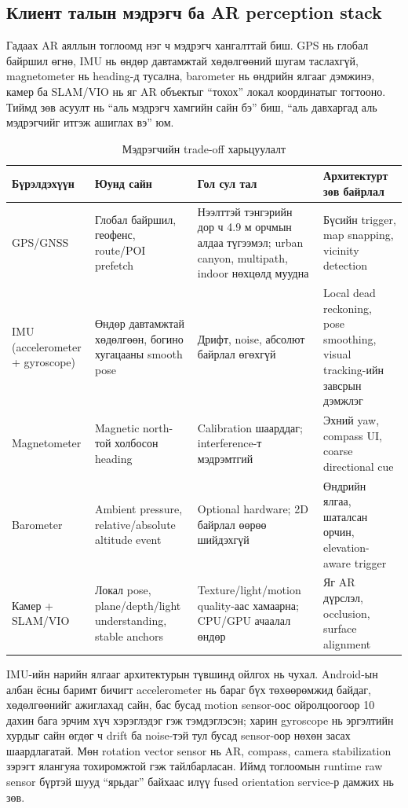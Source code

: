 \begin{sloppy}
\section*{Клиент талын мэдрэгч ба AR perception stack}

Гадаах AR аяллын тоглоомд нэг ч мэдрэгч хангалттай биш. GPS нь глобал байршил өгнө, IMU нь өндөр давтамжтай хөдөлгөөний шугам таслахгүй, magnetometer нь heading-д тусална, barometer нь өндрийн ялгааг дэмжинэ, камер ба SLAM/VIO нь яг AR объектыг ``тохох'' локал координатыг тогтооно. Тиймд зөв асуулт нь ``аль мэдрэгч хамгийн сайн бэ'' биш, ``аль давхаргад аль мэдрэгчийг итгэж ашиглах вэ'' юм.

\begin{table}[H]
\centering
\caption{Мэдрэгчийн trade-off харьцуулалт}
\label{tab:sensor-tradeoff}
\small
\begin{tabular}{|p{2.5cm}|p{3cm}|p{3.5cm}|p{3cm}|}
\hline
\textbf{Бүрэлдэхүүн} & \textbf{Юунд сайн} & \textbf{Гол сул тал} & \textbf{Архитектурт зөв байрлал} \\ \hline
GPS/GNSS & Глобал байршил, геофенс, route/POI prefetch & Нээлттэй тэнгэрийн дор ч 4.9 м орчмын алдаа түгээмэл; urban canyon, multipath, indoor нөхцөлд муудна & Бүсийн trigger, map snapping, vicinity detection \\ \hline
IMU (accelerometer + gyroscope) & Өндөр давтамжтай хөдөлгөөн, богино хугацааны smooth pose & Дрифт, noise, абсолют байрлал өгөхгүй & Local dead reckoning, pose smoothing, visual tracking-ийн завсрын дэмжлэг \\ \hline
Magnetometer & Magnetic north-той холбосон heading & Calibration шаарддаг; interference-т мэдрэмтгий & Эхний yaw, compass UI, coarse directional cue \\ \hline
Barometer & Ambient pressure, relative/absolute altitude event & Optional hardware; 2D байрлал өөрөө шийдэхгүй & Өндрийн ялгаа, шаталсан орчин, elevation-aware trigger \\ \hline
Камер + SLAM/VIO & Локал pose, plane/depth/light understanding, stable anchors & Texture/light/motion quality-аас хамаарна; CPU/GPU ачаалал өндөр & Яг AR дүрслэл, occlusion, surface alignment \\ \hline
\end{tabular}
\end{table}

IMU-ийн нарийн ялгааг архитектурын түвшинд ойлгох нь чухал. Android-ын албан ёсны баримт бичигт accelerometer нь бараг бүх төхөөрөмжид байдаг, хөдөлгөөнийг ажиглахад сайн, бас бусад motion sensor-оос ойролцоогоор 10 дахин бага эрчим хүч хэрэглэдэг гэж тэмдэглэсэн; харин gyroscope нь эргэлтийн хурдыг сайн өгдөг ч drift ба noise-тэй тул бусад sensor-оор нөхөн засах шаардлагатай. Мөн rotation vector sensor нь AR, compass, camera stabilization зэрэгт ялангуяа тохиромжтой гэж тайлбарласан. Иймд тоглоомын runtime raw sensor бүртэй шууд ``ярьдаг'' байхаас илүү fused orientation service-р дамжих нь зөв.


\end{sloppy}
